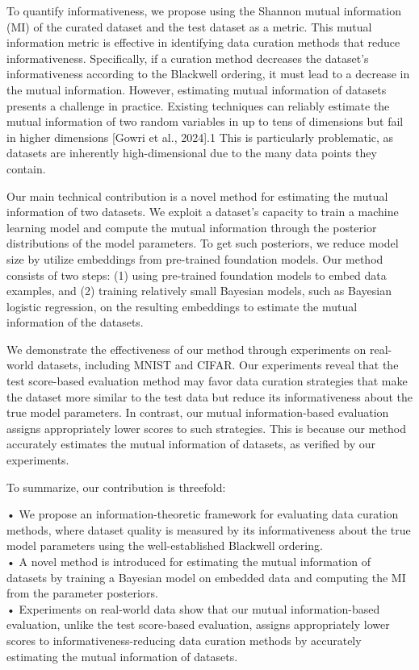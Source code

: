 To quantify informativeness, we propose using the Shannon mutual
information (MI) of the curated dataset and the test dataset as a
metric. This mutual information metric is effective in identifying data
curation methods that reduce informativeness. Specifically, if a
curation method decreases the dataset's informativeness according to the
Blackwell ordering, it must lead to a decrease in the mutual
information. However, estimating mutual information of datasets presents
a challenge in practice. Existing techniques can reliably estimate the
mutual information of two random variables in up to tens of dimensions
but fail in higher dimensions {[}Gowri et al., 2024{]}.1 This is
particularly problematic, as datasets are inherently high-dimensional
due to the many data points they contain.

Our main technical contribution is a novel method for estimating the
mutual information of two datasets. We exploit a dataset's capacity to
train a machine learning model and compute the mutual information
through the posterior distributions of the model parameters. To get such
posteriors, we reduce model size by utilize embeddings from pre-trained
foundation models. Our method consists of two steps: (1) using
pre-trained foundation models to embed data examples, and (2) training
relatively small Bayesian models, such as Bayesian logistic regression,
on the resulting embeddings to estimate the mutual information of the
datasets.

We demonstrate the effectiveness of our method through experiments on
real-world datasets, including MNIST and CIFAR. Our experiments reveal
that the test score-based evaluation method may favor data curation
strategies that make the dataset more similar to the test data but
reduce its informativeness about the true model parameters. In contrast,
our mutual information-based evaluation assigns appropriately lower
scores to such strategies. This is because our method accurately
estimates the mutual information of datasets, as verified by our
experiments.

To summarize, our contribution is threefold:

• We propose an information-theoretic framework for evaluating data
curation methods, where dataset quality is measured by its
informativeness about the true model parameters using the
well-established Blackwell ordering.\\
• A novel method is introduced for estimating the mutual information of
datasets by training a Bayesian model on embedded data and computing the
MI from the parameter posteriors.\\
• Experiments on real-world data show that our mutual information-based
evaluation, unlike the test score-based evaluation, assigns
appropriately lower scores to informativeness-reducing data curation
methods by accurately estimating the mutual information of datasets.

